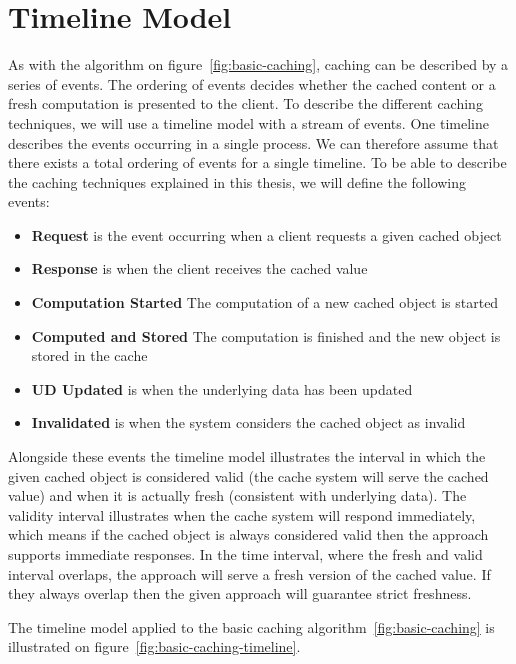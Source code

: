 
\section{Timeline Model}
\label{sec:timeline-model}

As with the algorithm on figure~\ref{fig:basic-caching}, caching can be described by a series of events. The ordering of events decides whether the cached content or a fresh computation is presented to the client. To describe the different caching techniques, we will use a timeline model with a stream of events. One timeline describes the events occurring in a single process. We can therefore assume that there exists a total ordering of events for a single timeline. To be able to describe the caching techniques explained in this thesis, we will define the following events:

\begin{itemize}
  \item \textbf{Request} is the event occurring when a client requests a given cached object
  \item \textbf{Response} is when the client receives the cached value
  \item \textbf{Computation Started} The computation of a new cached object is started
  \item \textbf{Computed and Stored} The computation is finished and the new object is stored in the cache
  \item \textbf{UD Updated} is when the underlying data has been updated
  \item \textbf{Invalidated} is when the system considers the cached object as invalid
\end{itemize}

Alongside these events the timeline model illustrates the interval in which the given cached object is considered valid (the cache system will serve the cached value) and when it is actually fresh (consistent with underlying data). The validity interval illustrates when the cache system will respond immediately, which means if the cached object is always considered valid then the approach supports immediate responses. In the time interval, where the fresh and valid interval overlaps, the approach will serve a fresh version of the cached value. If they always overlap then the given approach will guarantee strict freshness.

The timeline model applied to the basic caching algorithm~\ref{fig:basic-caching} is illustrated on figure~\ref{fig:basic-caching-timeline}.

